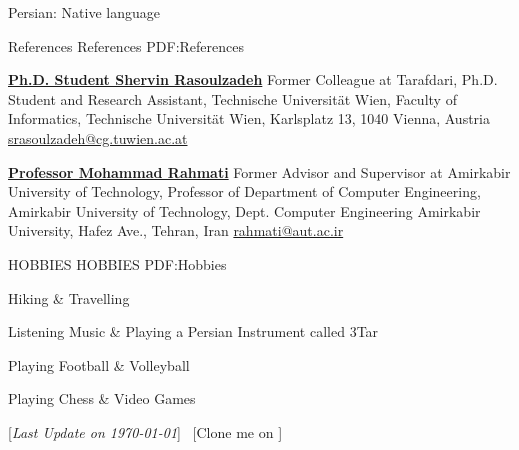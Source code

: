 \documentclass[letterpaper,MMMyyyy,nonstopmode]{resume}
\newcommand{\CVNote}{Last Update on \today}
\begin{document}
\begin{Body}
\Gap
\BulletItem
Persian: Native language


\Section
{References}
{References}
{PDF:References}

\BulletItem
\href{https://www.linkedin.com/in/srasoulzadeh}
{\textbf{Ph.D. Student Shervin Rasoulzadeh}}
\newline
Former Colleague at Tarafdari,
\newline
Ph.D. Student and Research Assistant, Technische Universität Wien,
\newline
Faculty of Informatics, Technische Universität Wien, Karlsplatz 13, 1040 Vienna, Austria
\newline
\href{mailto:srasoulzadeh@cg.tuwien.ac.at}
{srasoulzadeh@cg.tuwien.ac.at}

\BigGap
\BulletItem
\href{https://aut.ac.ir/cv/2416/Mohammad-Rahmati?slc_lang=en&&cv=2416&mod=scv}
{\textbf{Professor Mohammad Rahmati}}
\newline
Former Advisor and Supervisor at Amirkabir University of Technology,
\newline
Professor of Department of Computer Engineering, Amirkabir University of Technology,
\newline
Dept. Computer Engineering Amirkabir University, Hafez Ave., Tehran, Iran
\newline
\href{mailto:rahmatiaut.ac.ir}
{rahmati@aut.ac.ir}


\Section
{HOBBIES}
{HOBBIES}
{PDF:Hobbies}

\BulletItem
Hiking \& Travelling

\Gap
\BulletItem
Listening Music \& Playing a Persian Instrument called 3Tar

\Gap
\BulletItem
Playing Football \& Volleyball

\Gap
\BulletItem
Playing Chess \& Video Games


{\UseNoteFont
\hfill
[\textit{\CVNote}]
\SubBulletSymbol\,
[Clone me on
\href{https://github.com/aliyazdi75/Resume}
{\faGithub}]}

\end{Body}
\end{document}
